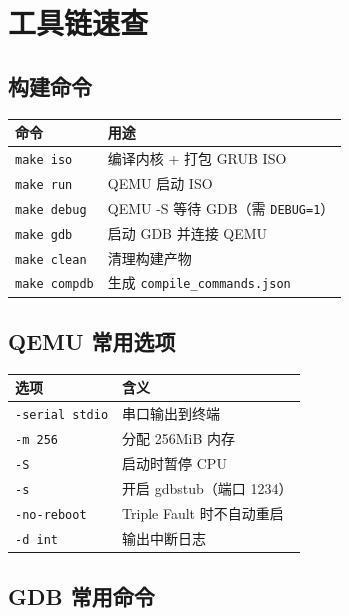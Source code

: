 \chapter{工具链速查}
\label{ch:appendix-tools}

\section{构建命令}

\begin{longtable}{ll}
  \toprule
  \textbf{命令} & \textbf{用途} \\
  \midrule
  \texttt{make iso}            & 编译内核 + 打包 GRUB ISO \\
  \texttt{make run}            & QEMU 启动 ISO \\
  \texttt{make debug}          & QEMU -S 等待 GDB（需 \texttt{DEBUG=1}） \\
  \texttt{make gdb}            & 启动 GDB 并连接 QEMU \\
  \texttt{make clean}          & 清理构建产物 \\
  \texttt{make compdb}         & 生成 \texttt{compile\_commands.json} \\
  \bottomrule
\end{longtable}

\section{QEMU 常用选项}

\begin{longtable}{ll}
  \toprule
  \textbf{选项} & \textbf{含义} \\
  \midrule
  \texttt{-serial stdio}    & 串口输出到终端 \\
  \texttt{-m 256}           & 分配 256MiB 内存 \\
  \texttt{-S}               & 启动时暂停 CPU \\
  \texttt{-s}               & 开启 gdbstub（端口 1234） \\
  \texttt{-no-reboot}       & Triple Fault 时不自动重启 \\
  \texttt{-d int}           & 输出中断日志 \\
  \bottomrule
\end{longtable}

\section{GDB 常用命令}

